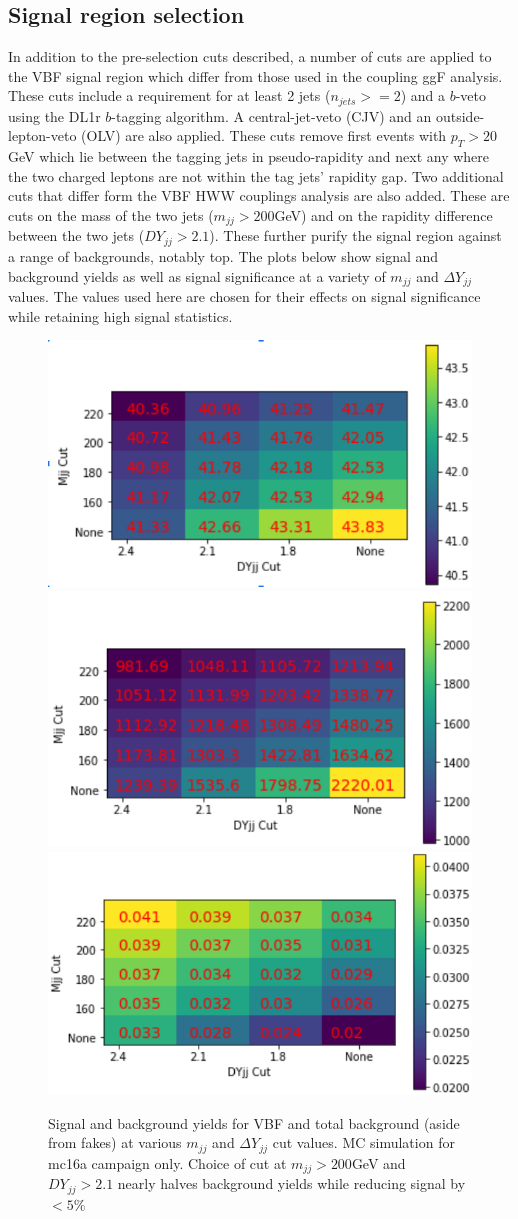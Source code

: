 \subsection{Signal region selection}
In addition to the pre-selection cuts described, a number of cuts are applied to the VBF signal region which differ from those used in the coupling ggF analysis. These cuts include a requirement for at least 2 jets ($n_{jets}>=2$) and a $b$-veto using the DL1r $b$-tagging algorithm. A central-jet-veto (CJV) and an outside-lepton-veto (OLV) are also applied. These cuts remove first events with $p_T >20$GeV which lie between the tagging jets in pseudo-rapidity and next any where the two charged leptons are not within the tag jets' rapidity gap. Two additional cuts that differ form the VBF HWW couplings analysis are also added. These are cuts on the mass of the two jets ($m_{jj}>200$GeV) and on the rapidity difference between the two jets ($DY_{jj}>2.1$). These further purify the signal region against a range of backgrounds, notably top. The plots below show signal and background yields as well as signal significance at a variety of $m_{jj}$ and $\Delta Y_{jj}$ values. The values used here are chosen for their effects on signal significance while retaining high signal statistics. 

\begin{figure}[!htbp]
\centering
\includegraphics[width=.3\linewidth]{Pictures/MjjDYjjVBF.png}
\includegraphics[width=.3\linewidth]{Pictures/MjjDYjjBackground.png}
\includegraphics[width=.3\linewidth]{Pictures/MjjDYjjSig.png}
\caption{Signal and background yields for VBF and total background (aside from fakes) at various $m_{jj}$ and $\Delta Y_{jj}$ cut values. MC simulation for mc16a campaign only. Choice of cut at $m_{jj}>200$GeV and $DY_{jj}>2.1$ nearly halves background yields while reducing signal by $<5\%$}
\label{fig:MjjDYjjSig}
\end{figure}

